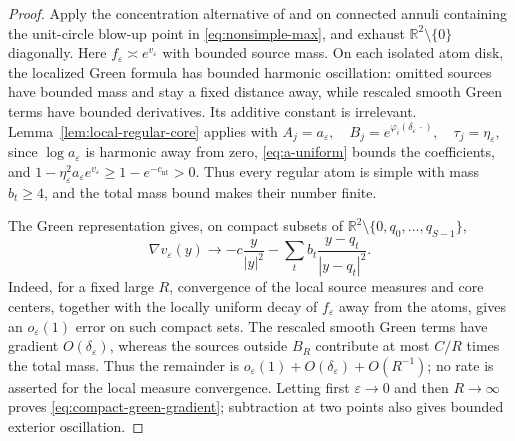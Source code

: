 \documentclass[11pt,reqno]{amsart}
\numberwithin{equation}{section}
\theoremstyle{definition}
\theoremstyle{remark}
\newcommand{\R}{\mathbb R}
\newcommand{\eps}{\varepsilon}
\newcommand{\etae}{\eta_{\eps}}
\newcommand{\de}{\delta_{\eps}}
\begin{document}
\begin{proof}
Apply the concentration alternative of \cite{ChoeKim} and
\cite[Section~2]{LinYanAIHP} on connected annuli containing the
unit-circle blow-up point in \eqref{eq:nonsimple-max}, and exhaust
$\R^2\setminus\{0\}$ diagonally. Here $f_\eps\asymp e^{v_\eps}$
with bounded source mass. On each isolated atom disk, the localized
Green formula has bounded harmonic oscillation: omitted sources have
bounded mass and stay a fixed distance away, while rescaled smooth
Green terms have bounded derivatives. Its additive constant is irrelevant.
Lemma~\ref{lem:local-regular-core} applies with
\(A_j=a_\eps,\quad B_j=e^{\varphi_i(\de\,\cdot)},\quad\tau_j=\etae\),
since $\log a_\eps$ is harmonic away from zero,
\eqref{eq:a-uniform} bounds the coefficients, and
$1-\etae^2a_\eps e^{v_\eps}\ge1-e^{-c_{\mathrm{nt}}}>0$.
Thus every regular atom is simple with mass $b_t\ge4$, and the
total mass bound makes their number finite.

The Green representation gives, on compact subsets of
$\R^2\setminus\{0,q_0,\ldots,q_{S-1}\}$,
\begin{equation}\label{eq:compact-green-gradient}
 \nabla v_\eps(y)\longrightarrow
 -c\frac{y}{|y|^2}
 -\sum_t b_t\frac{y-q_t}{|y-q_t|^2}.
\end{equation}
Indeed, for a fixed large $R$, convergence of the local source
measures and core centers, together with the locally uniform decay
of $f_\eps$ away from the atoms, gives an $o_\eps(1)$ error on such
compact sets. The rescaled smooth Green terms have gradient $O(\de)$,
whereas the sources outside $B_R$ contribute at most $C/R$ times
the total mass. Thus the remainder is
$o_\eps(1)+O(\de)+O(R^{-1})$; no rate is asserted for the local
measure convergence. Letting first $\eps\to0$ and then $R\to\infty$
proves \eqref{eq:compact-green-gradient}; subtraction at two points
also gives bounded exterior oscillation.


\end{proof}
\end{document}
